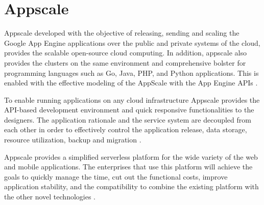 \section{Appscale}
Appscale developed with the objective of releasing, sending and scaling 
the Google App Engine applications over the public and private systems 
of the cloud, provides the scalable open-source cloud computing. 
In addition, appscale also provides the clusters on the same environment 
and comprehensive bolster for programming languages such as Go, Java, PHP, 
and Python applications. This is enabled with the effective modeling
of the AppScale with the App Engine APIs \cite{hid-sp18-412-wiki_appscale}.

To enable running applications on any cloud infrastructure Appscale 
provides the API-based development environment and quick responsive 
functionalities to the designers. The application rationale and the 
service system are decoupled from each other in order to effectively 
control the application release, data storage, resource utilization, 
backup and migration \cite{hid-sp18-412-wiki_appscale}.

Appscale provides a simplified serverless platform for the wide 
variety of the web and mobile applications. The enterprises that use 
this platform will achieve the goals to quickly manage the time, 
cut out the functional costs, improve application stability, and 
the compatibility to combine the existing platform with the other 
novel technologies \cite{hid-sp18-412-git_appscale}.



